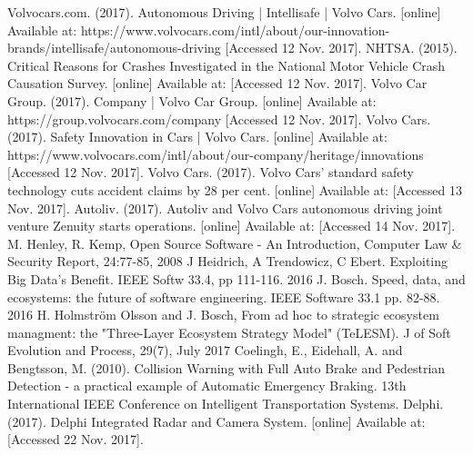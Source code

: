 \documentclass[conference]{IEEEtran}
\begin{document}
\begin{thebibliography}{00}
	 Volvocars.com. (2017). Autonomous Driving | Intellisafe | Volvo Cars. [online] Available at: https://www.volvocars.com/intl/about/our-innovation-brands/intellisafe/autonomous-driving [Accessed 12 Nov. 2017].
	 NHTSA. (2015). Critical Reasons for Crashes Investigated in the National Motor Vehicle Crash Causation Survey. [online] Available at:  [Accessed 12 Nov. 2017].
	 Volvo Car Group. (2017). Company | Volvo Car Group. [online] Available at: https://group.volvocars.com/company [Accessed 12 Nov. 2017].
	 Volvo Cars. (2017). Safety Innovation in Cars | Volvo Cars. [online] Available at: https://www.volvocars.com/intl/about/our-company/heritage/innovations [Accessed 12 Nov. 2017].
	 Volvo Cars. (2017). Volvo Cars' standard safety technology cuts accident claims by 28 per cent. [online] Available at:  [Accessed 13 Nov. 2017].
	 Autoliv. (2017). Autoliv and Volvo Cars autonomous driving joint venture Zenuity starts operations. [online] Available at:  [Accessed 14 Nov. 2017].
	 M. Henley, R. Kemp, Open Source Software - An Introduction, Computer Law \& Security Report, 24:77-85, 2008
	 J Heidrich, A Trendowicz, C Ebert. Exploiting Big Data's Benefit. IEEE Softw 33.4, pp 111-116. 2016
	 J. Bosch. Speed, data, and ecosystems: the future of software engineering. IEEE Software 33.1 pp. 82-88. 2016
	 H. Holmstr\"{o}m Olsson and J. Bosch, From ad hoc to strategic ecosystem managment: the "Three-Layer Ecosystem Strategy Model" (TeLESM). J of Soft Evolution and Process, 29(7), July 2017
	 Coelingh, E., Eidehall, A. and Bengtsson, M. (2010). Collision Warning with Full Auto Brake and Pedestrian Detection - a practical example of Automatic Emergency Braking. 13th International IEEE Conference on Intelligent Transportation Systems.
	 Delphi. (2017). Delphi Integrated Radar and Camera System. [online] Available at:  [Accessed 22 Nov. 2017].

\end{thebibliography}
\end{document}
